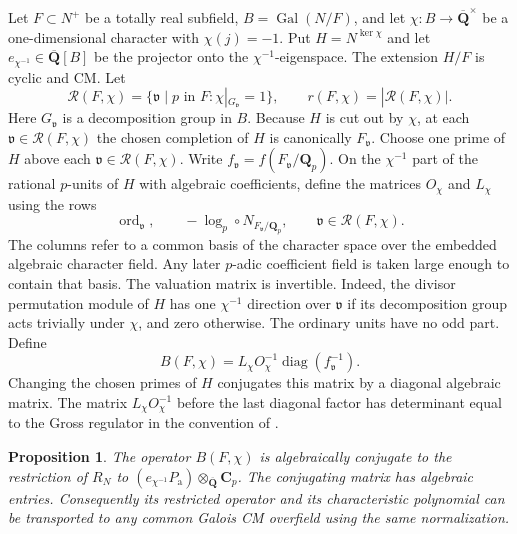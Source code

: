 \documentclass[11pt]{amsart}
\numberwithin{equation}{section}
\newtheorem{proposition}[theorem]{Proposition}
\theoremstyle{definition}
\theoremstyle{remark}
\newcommand{\Q}{\mathbf Q}
\newcommand{\Qbar}{\overline{\mathbf Q}}
\newcommand{\Cp}{\mathbf C_p}
\newcommand{\Gal}{\operatorname{Gal}}
\newcommand{\ord}{\operatorname{ord}}
\begin{document}
Let $F\subset N^+$ be a totally real subfield,
$B=\Gal(N/F)$, and let $\chi:B\to\Qbar^\times$ be a
one-dimensional character with $\chi(j)=-1$. Put
$H=N^{\ker\chi}$ and let $e_{\chi^{-1}}\in\Qbar[B]$
be the projector onto the $\chi^{-1}$-eigenspace.
The extension $H/F$ is cyclic and CM. Let
\[
 \mathcal R(F,\chi)=\{\mathfrak v\mid p\text{ in }F:
                      \chi|_{G_{\mathfrak v}}=1\},\qquad
 r(F,\chi)=|\mathcal R(F,\chi)| .
\]
Here $G_\mathfrak v$ is a decomposition group in $B$.
Because $H$ is cut out by $\chi$, at each
$\mathfrak v\in\mathcal R(F,\chi)$ the chosen completion
of $H$ is canonically $F_\mathfrak v$. Choose one prime
of $H$ above each $\mathfrak v\in\mathcal R(F,\chi)$.
Write $f_\mathfrak v=f(F_\mathfrak v/\Q_p)$.
On the $\chi^{-1}$ part of the rational $p$-units of
$H$ with algebraic coefficients, define the matrices
$O_\chi$ and $L_\chi$ using the rows
\[
 \ord_\mathfrak v,\qquad
 -\log_p\circ N_{F_\mathfrak v/\Q_p},
 \qquad \mathfrak v\in\mathcal R(F,\chi).
\]
The columns refer to a common basis of the character space
over the embedded algebraic character field. Any later $p$-adic
coefficient field is taken large enough to contain that basis. The valuation matrix is invertible.
Indeed, the divisor permutation module of $H$ has
one $\chi^{-1}$ direction over $\mathfrak v$ if its
decomposition group acts trivially under $\chi$, and zero
otherwise. The ordinary units have no odd part. Define
\begin{equation}\label{eq:normalizedmatrix}
 B(F,\chi)=L_\chi O_\chi^{-1}\operatorname{diag}(f_\mathfrak v^{-1}) .
\end{equation}
Changing the chosen primes of $H$ conjugates this matrix by
a diagonal algebraic matrix. The matrix $L_\chi O_\chi^{-1}$
before the last diagonal factor has determinant equal to the
Gross regulator in the convention of \cite[\S1.1]{DKV}.

\begin{proposition}\label{prop:descent}
The operator $B(F,\chi)$ is algebraically conjugate to
the restriction of $R_N$ to
$(e_{\chi^{-1}}P_{\mathrm a})\otimes_{\Qbar}\Cp$. The conjugating
matrix has algebraic entries.
Consequently its restricted operator and its characteristic
polynomial can be transported to any common Galois CM
overfield using the same normalization.
\end{proposition}
\end{document}
